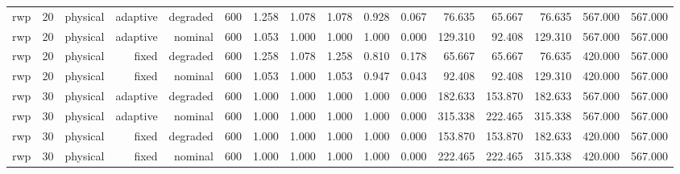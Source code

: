 \begin{tabular}{lrrrrrrrrrrrrrrr}
rwp & 20 & physical & adaptive & degraded & 600 & 1.258 & 1.078 & 1.078 & 0.928 & 0.067 & 76.635 & 65.667 & 76.635 & 567.000 & 567.000 \\
rwp & 20 & physical & adaptive & nominal & 600 & 1.053 & 1.000 & 1.000 & 1.000 & 0.000 & 129.310 & 92.408 & 129.310 & 567.000 & 567.000 \\
rwp & 20 & physical & fixed & degraded & 600 & 1.258 & 1.078 & 1.258 & 0.810 & 0.178 & 65.667 & 65.667 & 76.635 & 420.000 & 567.000 \\
rwp & 20 & physical & fixed & nominal & 600 & 1.053 & 1.000 & 1.053 & 0.947 & 0.043 & 92.408 & 92.408 & 129.310 & 420.000 & 567.000 \\
rwp & 30 & physical & adaptive & degraded & 600 & 1.000 & 1.000 & 1.000 & 1.000 & 0.000 & 182.633 & 153.870 & 182.633 & 567.000 & 567.000 \\
rwp & 30 & physical & adaptive & nominal & 600 & 1.000 & 1.000 & 1.000 & 1.000 & 0.000 & 315.338 & 222.465 & 315.338 & 567.000 & 567.000 \\
rwp & 30 & physical & fixed & degraded & 600 & 1.000 & 1.000 & 1.000 & 1.000 & 0.000 & 153.870 & 153.870 & 182.633 & 420.000 & 567.000 \\
rwp & 30 & physical & fixed & nominal & 600 & 1.000 & 1.000 & 1.000 & 1.000 & 0.000 & 222.465 & 222.465 & 315.338 & 420.000 & 567.000 \\
\bottomrule
\end{tabular}